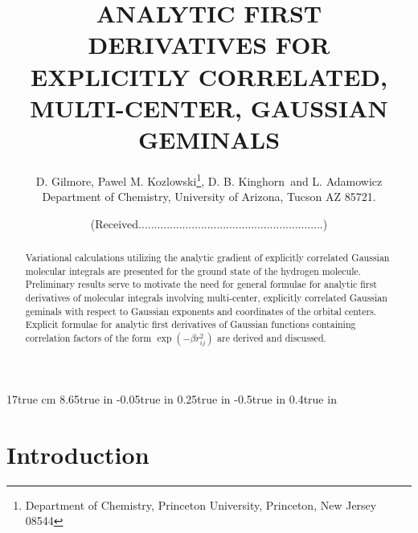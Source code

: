 

\textwidth 17true cm
\textheight 8.65true in
\oddsidemargin -0.05true in
\evensidemargin 0.25true in
\topmargin -0.5true in
\headsep 0.4true in
\renewcommand{\baselinestretch}{1.5}



\title{ANALYTIC FIRST DERIVATIVES FOR EXPLICITLY CORRELATED, MULTI-CENTER, GAUSSIAN
GEMINALS}
\author{D. Gilmore, Pawel M. Kozlowski\thanks{%
Department of Chemistry, Princeton University, Princeton, New Jersey 08544},
D. B. Kinghorn\ and L. Adamowicz \\
Department of Chemistry, University of Arizona, Tucson AZ 85721.}
\date{(Received...........................................................)}
\maketitle

\begin{abstract}
Variational calculations utilizing the analytic gradient of explicitly
correlated Gaussian molecular integrals are presented for the ground state
of the hydrogen molecule. Preliminary results serve to motivate the need for
general formulae for analytic first derivatives of molecular integrals
involving multi-center, explicitly correlated Gaussian geminals with respect
to Gaussian exponents and coordinates of the orbital centers. Explicit
formulae for analytic first derivatives of Gaussian functions containing
correlation factors of the form $\exp (-\beta r_{ij}^2)$ are derived and
discussed.
\end{abstract}

\newpage

\section{Introduction}

